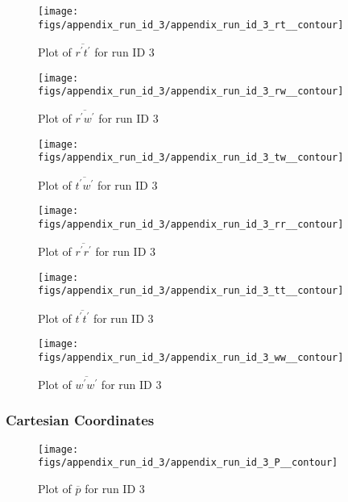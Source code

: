\begin{figure}[H]
\centering
\texttt{[image: figs/appendix\_run\_id\_3/appendix\_run\_id\_3\_rt\_\_contour]}
\caption{Plot of $\overline{r^\prime t^\prime}$ for run ID 3}
\label{fig:appendix_run_id_3_rt__contour}
\end{figure}


\begin{figure}[H]
\centering
\texttt{[image: figs/appendix\_run\_id\_3/appendix\_run\_id\_3\_rw\_\_contour]}
\caption{Plot of $\overline{r^\prime w^\prime}$ for run ID 3}
\label{fig:appendix_run_id_3_rw__contour}
\end{figure}


\begin{figure}[H]
\centering
\texttt{[image: figs/appendix\_run\_id\_3/appendix\_run\_id\_3\_tw\_\_contour]}
\caption{Plot of $\overline{t^\prime w^\prime}$ for run ID 3}
\label{fig:appendix_run_id_3_tw__contour}
\end{figure}


\begin{figure}[H]
\centering
\texttt{[image: figs/appendix\_run\_id\_3/appendix\_run\_id\_3\_rr\_\_contour]}
\caption{Plot of $\overline{r^\prime r^\prime}$ for run ID 3}
\label{fig:appendix_run_id_3_rr__contour}
\end{figure}


\begin{figure}[H]
\centering
\texttt{[image: figs/appendix\_run\_id\_3/appendix\_run\_id\_3\_tt\_\_contour]}
\caption{Plot of $\overline{t^\prime t^\prime}$ for run ID 3}
\label{fig:appendix_run_id_3_tt__contour}
\end{figure}


\begin{figure}[H]
\centering
\texttt{[image: figs/appendix\_run\_id\_3/appendix\_run\_id\_3\_ww\_\_contour]}
\caption{Plot of $\overline{w^\prime w^\prime}$ for run ID 3}
\label{fig:appendix_run_id_3_ww__contour}
\end{figure}


\subsubsection{Cartesian Coordinates}
\begin{figure}[H]
\centering
\texttt{[image: figs/appendix\_run\_id\_3/appendix\_run\_id\_3\_P\_\_contour]}
\caption{Plot of $\overline{p}$ for run ID 3}
\label{fig:appendix_run_id_3_P__contour}
\end{figure}


